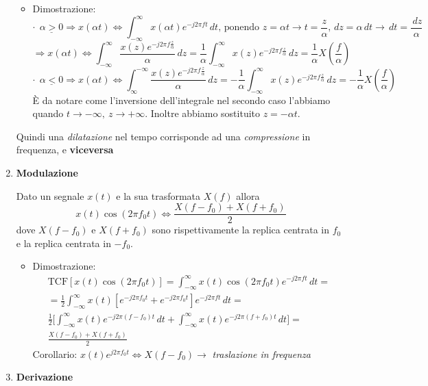 \documentclass[
]{article}
\providecommand{\tightlist}{%
  \setlength{\itemsep}{0pt}\setlength{\parskip}{0pt}}
\begin{document}
\begin{enumerate}
  \begin{itemize}
  \tightlist
  \item
    Dimostrazione: \[
    \cdot \ \ \underline{\alpha > 0} \Rightarrow x(\alpha t) \Longleftrightarrow \int_{-\infty}^{\infty} x(\alpha t) e^{-j2\pi ft} \,dt \text{, ponendo } z=\alpha t \to t = \frac{z}{\alpha}, \,dz = \alpha \,dt \to \,dt = \frac{\,dz}{\alpha} 
    \] \[
    \Rightarrow x(\alpha t) \Longleftrightarrow \int_{-\infty}^{\infty} \frac{x(z) e^{-j2\pi f \frac{z}{\alpha}}}{\alpha} \,dz = \frac{1}{\alpha}\int_{-\infty}^{\infty} x(z) e^{-j2\pi f \frac{z}{\alpha}} \,dz = \frac{1}{\alpha} X(\frac{f}{\alpha})
    \] \[
    \cdot \ \ \underline{\alpha < 0} \Rightarrow x(\alpha t) \Longleftrightarrow \int_{\infty}^{-\infty} \frac{x(z) e^{-j2\pi f \frac{z}{\alpha}}}{\alpha} \,dz = -\frac{1}{\alpha}\int_{-\infty}^{\infty} x(z) e^{-j2\pi f \frac{z}{\alpha}} \,dz = -\frac{1}{\alpha} X(\frac{f}{\alpha})
    \] È da notare come l'inversione dell'integrale nel secondo caso
    l'abbiamo quando \(t \to -\infty, \ z \to +\infty\). Inoltre abbiamo
    sostituito \(z=-\alpha t\).
  \end{itemize}

  Quindi una \emph{dilatazione} nel tempo corrisponde ad una
  \emph{compressione} in frequenza, e \textbf{viceversa}
\item
  \textbf{Modulazione}

  Dato un segnale \(x(t)\) e la sua trasformata \(X(f)\) allora \[
  x(t)\cos(2\pi f_{0}t) \Longleftrightarrow \frac{X(f-f_0)+X(f+f_0)}{2}
  \] dove \(X(f-f_0)\) e \(X(f+f_0)\) sono rispettivamente la replica
  centrata in \(f_0\) e la replica centrata in \(-f_0\).

  \begin{itemize}
  \tightlist
  \item
    Dimostrazione: \begin{gather*}
    \text{TCF}[x(t)\cos(2\pi f_{0}t)] = \int_{-\infty}^{\infty} x(t)\cos(2\pi f_{0}t)  e^{-j2\pi ft} \,dt = 
    \\
    = \frac{1}{2} \int_{-\infty}^{\infty} x(t) [e^{-j2\pi f_0 t}+ e^{-j2\pi f_0 t}]e^{-j2\pi ft} \,dt =\\ \frac{1}{2}\Big[\int_{-\infty}^{\infty}x(t)  e^{-j2\pi (f-f_0)t}\,dt + \int_{-\infty}^{\infty}x(t)  e^{-j2\pi (f+f_0)t}\,dt  \Big] =
    \\
    \frac{X(f-f_0)+X(f+f_0)}{2}
    \end{gather*} Corollario:
    \(x(t)e^{j2\pi f_{0}t} \Longleftrightarrow X(f-f_0) \to\)
    \emph{traslazione in frequenza}
  \end{itemize}
\item
  \textbf{Derivazione}


\end{enumerate}
\end{document}

